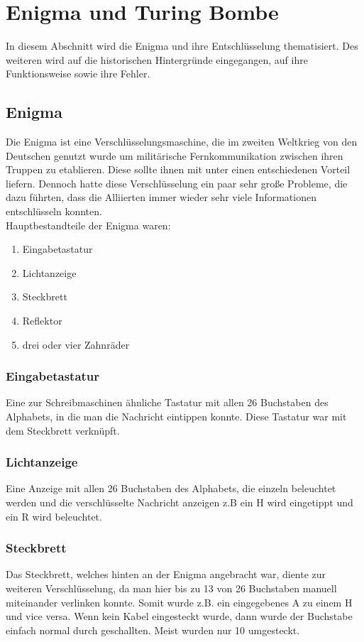 \section{Enigma und Turing Bombe}
In diesem Abschnitt wird die Enigma und ihre Entschlüsselung thematisiert. Des weiteren wird auf die historischen Hintergründe eingegangen, auf ihre Funktionsweise sowie ihre Fehler.

\subsection{Enigma}
Die Enigma ist eine Verschlüsselungsmaschine, die im zweiten Weltkrieg von den Deutschen genutzt wurde um militärische Fernkommunikation zwischen ihren Truppen zu etablieren. Diese sollte ihnen mit unter einen entschiedenen Vorteil liefern. Dennoch hatte diese Verschlüsselung ein paar sehr große Probleme, die dazu führten, dass die Alliierten immer wieder sehr viele Informationen entschlüsseln konnten.\\
Hauptbestandteile der Enigma waren:
\begin{enumerate}
\item Eingabetastatur
\item Lichtanzeige
\item Steckbrett
\item Reflektor
\item drei oder vier Zahnräder
\end{enumerate}

\subsubsection{Eingabetastatur}
Eine zur Schreibmaschinen ähnliche Tastatur mit allen 26 Buchstaben des Alphabets, in die man die Nachricht eintippen konnte. Diese Tastatur war mit dem Steckbrett verknüpft.

\subsubsection{Lichtanzeige}
Eine Anzeige mit allen 26 Buchstaben des Alphabets, die einzeln beleuchtet werden und die verschlüsselte Nachricht anzeigen z.B ein H wird eingetippt und ein R wird beleuchtet.

\subsubsection{Steckbrett}
\label{sec:steck}
Das Steckbrett, welches hinten an der Enigma angebracht war, diente zur weiteren Verschlüsselung, da man hier bis zu 13 von 26 Buchstaben manuell miteinander verlinken konnte. Somit wurde z.B. ein eingegebenes A zu einem H und vice versa. Wenn kein Kabel eingesteckt wurde, dann wurde der Buchstabe einfach normal durch geschallten. Meist wurden nur 10 umgesteckt.

